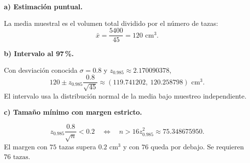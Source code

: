 \textbf{a) Estimación puntual.}\par\nopagebreak[4]
La media muestral es el volumen total dividido por el número de tazas:
\[
\boxed{\bar x=\frac{5400}{45}=120\text{ cm}^3}.
\]

\textbf{b) Intervalo al 97\,\%.}\par\nopagebreak[4]
Con desviación conocida $\sigma=0.8$ y $z_{0.985}\approx2.170090378$,
\[
120\pm z_{0.985}\frac{0.8}{\sqrt{45}}
\approx\boxed{(119.741202,\ 120.258798)\text{ cm}^3}.
\]
El intervalo usa la distribución normal de la media bajo muestreo independiente.

\textbf{c) Tamaño mínimo con margen estricto.}\par\nopagebreak[4]
\[
z_{0.985}\frac{0.8}{\sqrt n}<0.2
\quad\Longleftrightarrow\quad
n>16z_{0.985}^2\approx75.348675950.
\]
El margen con $75$ tazas supera $0.2\text{ cm}^3$ y con $76$ queda por debajo. Se requieren $\boxed{76\text{ tazas}}$.
